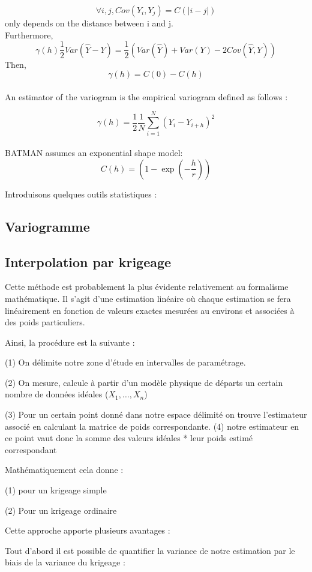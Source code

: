 \documentclass[hidelinks,12pt]{article}
\begin{document}
$$\forall i,j, Cov(Y_i,Y_{j})=C(|i-j|)$$ only depends on the distance between i and j.
\\
Furthermore, $$\gamma(h)\frac{1}{2}Var(\hat{Y}-Y)=\frac{1}{2}(Var(\hat{Y})+Var(Y)-2Cov(\hat{Y},Y))$$
Then,$$\gamma(h)=C(0)-C(h)$$
\\
An estimator of the variogram is the empirical variogram defined as follows :

$$\gamma(h)=\frac{1}{2} \frac{1}{N} \sum_{i=1}^{N} (Y_i - Y_{i+h})^2$$
\\
BATMAN assumes an exponential shape model: 
$$C(h)=\left(1- \exp{\left(-\frac{h}{r}\right)}\right)$$


Introduisons quelques outils statistiques :

\subsection{Variogramme}





\subsection{Interpolation par krigeage}

Cette méthode est probablement la plus évidente relativement au formalisme mathématique. Il s'agit d'une estimation linéaire où chaque estimation se fera linéairement en fonction de valeurs exactes mesurées au environs et associées à des poids particuliers.

Ainsi, la procédure est la suivante :

(1) On délimite notre zone d'étude en intervalles de paramétrage.

(2) On mesure, calcule à partir d'un modèle physique de départs un certain nombre de données idéales ($X_1,\ldots,X_n$)

(3) Pour un certain point donné dans notre espace délimité on trouve l'estimateur associé en calculant la matrice de poids correspondante.
(4) notre estimateur en ce point vaut donc la somme des valeurs idéales * leur poids estimé correspondant

Mathématiquement cela donne :

(1) pour un krigeage simple




(2) Pour un krigeage ordinaire

Cette approche apporte plusieurs avantages :


Tout d'abord il est possible de quantifier la variance de notre estimation par le biais de la variance du krigeage :
\end{document}
